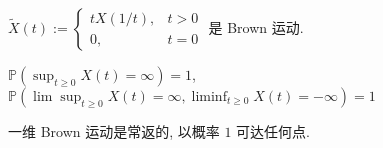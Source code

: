 \documentclass[10pt]{yerbaformat}
\begin{document}
\begin{theorem}
    $\tilde{X}(t):=\left\{\begin{array}{ll}t X(1 / t), & t>0 \\ 0, & t=0\end{array}\right.$ 是 Brown 运动.
\end{theorem}

\begin{theorem}
    $\mathbb{P}\left(\sup _{t \geq 0} X(t)=\infty\right)=1$, $\mathbb{P}\left(\lim \sup _{t \geq 0} X(t)=\infty, \liminf _{t \geq 0} X(t)=-\infty\right)=1$
\end{theorem}

\begin{lemma}
    一维 Brown 运动是常返的, 以概率 $1$ 可达任何点.
\end{lemma}
\end{document}
